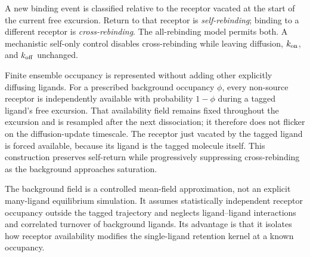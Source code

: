 A new binding event is classified relative to the receptor vacated at the
start of the current free excursion.  Return to that receptor is
\emph{self-rebinding}; binding to a different receptor is
\emph{cross-rebinding}.  The all-rebinding model permits both.  A mechanistic
self-only control disables cross-rebinding while leaving diffusion,
$k_{\mathrm{on}}$, and $k_{\mathrm{off}}$ unchanged.

Finite ensemble occupancy is represented without adding other explicitly
diffusing ligands.  For a prescribed background occupancy $\phi$, every
non-source receptor is independently available with probability $1-\phi$
during a tagged ligand's free excursion.  That availability field remains
fixed throughout the excursion and is resampled after the next dissociation;
it therefore does not flicker on the diffusion-update timescale.  The receptor
just vacated by the tagged ligand is forced available, because its ligand is
the tagged molecule itself.  This construction preserves self-return while
progressively suppressing cross-rebinding as the background approaches
saturation.

The background field is a controlled mean-field approximation, not an
explicit many-ligand equilibrium simulation.  It assumes statistically
independent receptor occupancy outside the tagged trajectory and neglects
ligand--ligand interactions and correlated turnover of background ligands.
Its advantage is that it isolates how receptor availability modifies the
single-ligand retention kernel at a known occupancy.
